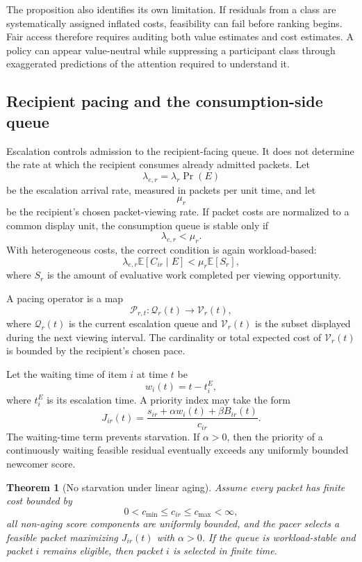 \documentclass[11pt]{article}
\newtheorem{theorem}[definition]{Theorem}
\theoremstyle{definition}
\newcommand{\E}{\mathbb{E}}
\begin{document}
The proposition also identifies its own limitation. If residuals from a class are systematically assigned inflated costs, feasibility can fail before ranking begins. Fair access therefore requires auditing both value estimates and cost estimates. A policy can appear value-neutral while suppressing a participant class through exaggerated predictions of the attention required to understand it.

\subsection{Recipient pacing and the consumption-side queue}

Escalation controls admission to the recipient-facing queue. It does not determine the rate at which the recipient consumes already admitted packets. Let
\[
\lambda_{e,r}
=
\lambda_r\Pr(E)
\]
be the escalation arrival rate, measured in packets per unit time, and let
\[
\mu_r
\]
be the recipient's chosen packet-viewing rate. If packet costs are normalized to a common display unit, the consumption queue is stable only if
\[
\lambda_{e,r}<\mu_r.
\]
With heterogeneous costs, the correct condition is again workload-based:
\[
\lambda_{e,r}
\E[C_{ir}\mid E]
<
\mu_r
\E[S_r],
\]
where \(S_r\) is the amount of evaluative work completed per viewing opportunity.

A pacing operator is a map
\[
\mathcal{P}_{r,t}:
\mathcal{Q}_r(t)
\longrightarrow
\mathcal{V}_r(t),
\]
where \(\mathcal{Q}_r(t)\) is the current escalation queue and \(\mathcal{V}_r(t)\) is the subset displayed during the next viewing interval. The cardinality or total expected cost of \(\mathcal{V}_r(t)\) is bounded by the recipient's chosen pace.

Let the waiting time of item \(i\) at time \(t\) be
\[
w_i(t)=t-t_i^{E},
\]
where \(t_i^{E}\) is its escalation time. A priority index may take the form
\[
J_{ir}(t)
=
\frac{
s_{ir}
+
\alpha w_i(t)
+
\beta B_{ir}(t)
}{
c_{ir}
}.
\]
The waiting-time term prevents starvation. If \(\alpha>0\), then the priority of a continuously waiting feasible residual eventually exceeds any uniformly bounded newcomer score.

\begin{theorem}[No starvation under linear aging]
Assume every packet has finite cost bounded by
\[
0<c_{\min}\leq c_{ir}\leq c_{\max}<\infty,
\]
all non-aging score components are uniformly bounded, and the pacer selects a feasible packet maximizing \(J_{ir}(t)\) with \(\alpha>0\). If the queue is workload-stable and packet \(i\) remains eligible, then packet \(i\) is selected in finite time.
\end{theorem}
\end{document}

